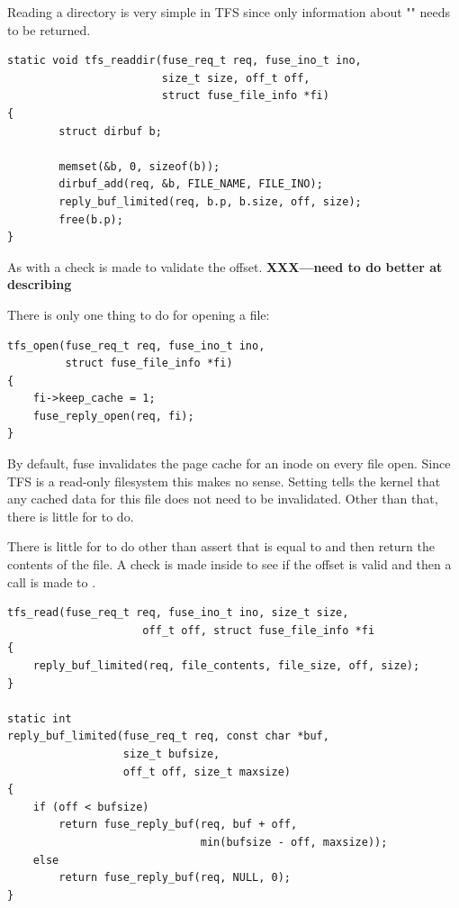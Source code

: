 \bigskip
\noindent
\textbf{}
\bigskip

\noindent
Reading a directory is very simple in TFS since only information about "" needs to be returned.

\begin{lstlisting}
static void tfs_readdir(fuse_req_t req, fuse_ino_t ino, 
                        size_t size, off_t off, 
                        struct fuse_file_info *fi) 
{
        struct dirbuf b;

        memset(&b, 0, sizeof(b));
        dirbuf_add(req, &b, FILE_NAME, FILE_INO);
        reply_buf_limited(req, b.p, b.size, off, size);
        free(b.p);
}
\end{lstlisting}

\noindent 
As with  a check is made to validate the offset. \textbf{XXX---need to do better at describing}

\bigskip
\noindent
\textbf{}
\bigskip

\noindent
There is only one thing to do for opening a file:

\begin{lstlisting}
tfs_open(fuse_req_t req, fuse_ino_t ino,
         struct fuse_file_info *fi)
{
    fi->keep_cache = 1;
    fuse_reply_open(req, fi);
}
\end{lstlisting}

\noindent
By default, fuse invalidates the page cache for an inode on every file open. Since TFS is a read-only filesystem this makes no sense. Setting  tells the kernel that any cached data for this file does not need to be invalidated. Other than that, there is little for  to do.

\bigskip
\noindent
\textbf{}
\bigskip

\noindent
There is little for  to do other than assert that  is equal to  and then return the contents of the file. A check is made inside  to see if the offset is valid and then a call is made to .

\begin{lstlisting}
tfs_read(fuse_req_t req, fuse_ino_t ino, size_t size,
                     off_t off, struct fuse_file_info *fi
{            
    reply_buf_limited(req, file_contents, file_size, off, size);
}

static int
reply_buf_limited(fuse_req_t req, const char *buf, 
                  size_t bufsize,
                  off_t off, size_t maxsize) 
{
    if (off < bufsize)
        return fuse_reply_buf(req, buf + off,
                              min(bufsize - off, maxsize));
    else
        return fuse_reply_buf(req, NULL, 0);
}   
\end{lstlisting}

